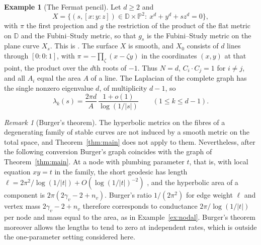 \documentclass[11pt]{amsart}
\theoremstyle{definition}
\newtheorem{example}[theorem]{Example}
\theoremstyle{remark}
\newtheorem{remark}[theorem]{Remark}
\newcommand{\PP}{\mathbb P}
\begin{document}
\begin{example}[The Fermat pencil]\label{ex:fermat}
Let $d\ge2$ and
\[
 X=\{(s,[x:y:z])\in\mathbb D\times\PP^2:\ x^d+y^d+sz^d=0\},
\]
with $\pi$ the first projection and $g$ the restriction of the product of
the flat metric on $\mathbb D$ and the Fubini--Study metric, so that $g_s$
is the Fubini--Study metric on the plane curve $X_s$. This is
\cite[Example~8.1]{dai-yoshikawa}. The surface $X$ is smooth, and $X_0$
consists of $d$ lines through $[0:0:1]$, with $\pi=-\prod_\zeta(x-\zeta y)$
in the coordinates $(x,y)$ at that point, the product over the $d$th
roots of $-1$. Thus $N=d$, $C_i\cdot C_j=1$ for $i\ne j$, and all $A_i$
equal the area $A$ of a line. The Laplacian of the complete graph has
the single nonzero eigenvalue $d$, of multiplicity $d-1$, so
\[
 \lambda_k(s)=\frac{2\pi d}{A}\,\frac{1+o(1)}{\log(1/|s|)}
 \qquad(1\le k\le d-1).
\]
\end{example}

\begin{remark}[Burger's theorem]\label{rem:burger}
The hyperbolic metrics on the fibres of a degenerating family of stable
curves are not induced by a smooth metric on the total space, and
Theorem~\ref{thm:main} does not apply to them. Nevertheless, after the
following conversion Burger's graph coincides with the graph of
Theorem~\ref{thm:main}. At a node with plumbing parameter $t$, that is,
with local equation $xy=t$ in the family, the short
geodesic has length $\ell=2\pi^2/\log(1/|t|)+O(\log(1/|t|)^{-2})$
\cite[Example~4.3]{wolpert}, and the hyperbolic area of a component is
$2\pi(2\gamma_v-2+n_v)$. Burger's ratio $1/(2\pi^2)$ for edge weight $\ell$ and
vertex mass $2\gamma_v-2+n_v$ \cite[Theorem~1.1]{burger} therefore corresponds
to conductance $2\pi/\log(1/|t|)$ per node and mass equal to the area, as
in Example~\ref{ex:nodal}. Burger's theorem moreover allows the lengths to
tend to zero at independent rates, which is outside the one-parameter
setting considered here.
\end{remark}
\end{document}

